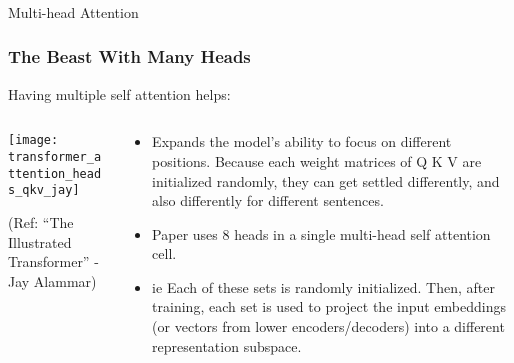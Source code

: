 			
			



			
			



\begin{frame}[fragile]\frametitle{}
\begin{center}
{\Large Multi-head Attention}
\end{center}
\end{frame}

\begin{frame}[fragile]\frametitle{The Beast With Many Heads}

Having multiple self attention helps:

\begin{columns}
    \begin{column}[T]{0.5\linewidth}
\begin{center}
\texttt{[image: transformer\_attention\_heads\_qkv\_jay]}


{\tiny (Ref: ``The Illustrated Transformer'' - Jay Alammar)}
\end{center}		

		\end{column}
    \begin{column}[T]{0.5\linewidth}

\begin{itemize}
\item Expands the model’s ability to focus on different positions. Because each weight matrices of Q K V are initialized randomly, they can get settled differently, and also differently for different sentences.
\item Paper uses 8 heads in a single multi-head self attention cell.
\item ie Each of these sets is randomly initialized. Then, after training, each set is used to project the input embeddings (or vectors from lower encoders/decoders) into a different representation subspace.
\end{itemize}
    \end{column}
  \end{columns}
\end{frame}

